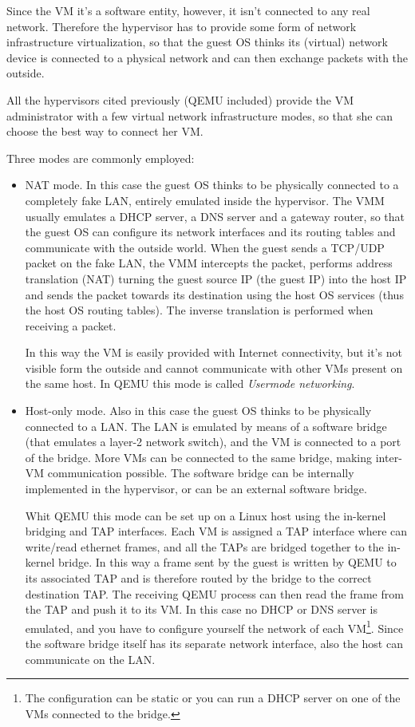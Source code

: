 Since the VM it's a software entity, however, it isn't connected to any real network. Therefore the hypervisor has to provide some
form of network infrastructure virtualization, so that the guest OS thinks its (virtual) network device is connected to a physical
network and can then exchange packets with the outside.

\vspace{0.5cm}

All the hypervisors cited previously (QEMU included) provide the VM administrator with a few virtual network infrastructure modes, 
so that she can choose the best way to connect her VM.

Three modes are commonly employed:
\begin{itemize}
    \item NAT mode. In this case the guest OS thinks to be physically connected to a completely fake LAN, entirely emulated inside the 
	  hypervisor. The VMM usually emulates a DHCP server, a DNS server and a gateway router, so that the guest OS can configure
	  its network interfaces and its routing tables
	  and communicate with the outside world. When the guest sends a TCP/UDP packet on the fake LAN, the VMM intercepts the packet,
	  performs address translation (NAT) turning the guest source IP (the guest IP) into the host IP and sends the packet towards
	  its destination using the host OS services (thus the host OS routing tables). The inverse translation is performed when
	  receiving a packet.
	  
	  In this way the VM is easily provided with Internet connectivity, but it's not visible form the outside
	  and cannot communicate with other VMs present on the same host.
	  In QEMU this mode is called \emph{Usermode networking}.

    \item Host-only mode. Also in this case the guest OS thinks to be physically connected to a LAN. The LAN is emulated
	  by means of a software bridge (that emulates a layer-2 network switch), and the VM is connected to a port of the bridge.
	  More VMs can be connected to the same bridge, making inter-VM communication possible. The software bridge can be internally
	  implemented in the hypervisor, or can be an external software bridge.
	  
	  Whit QEMU this mode can be set up on a Linux host using the in-kernel bridging and TAP interfaces. Each VM is assigned a TAP
	  interface where can write/read ethernet frames, and all the TAPs are bridged together to the in-kernel bridge.
	  In this way a frame sent by the guest is written by QEMU to its associated TAP and is therefore routed by the bridge
	  to the correct destination TAP. The receiving QEMU process can then read the frame from the TAP and push it to its VM.
	  In this case no DHCP or DNS server is emulated, and you have to configure yourself the network of each VM\footnote{The 
	  configuration can be static or you can run a DHCP server on one of the VMs connected to the bridge.}.
	  Since the software bridge itself has its separate network interface, also the host can communicate on the LAN.
	  

\end{itemize}
